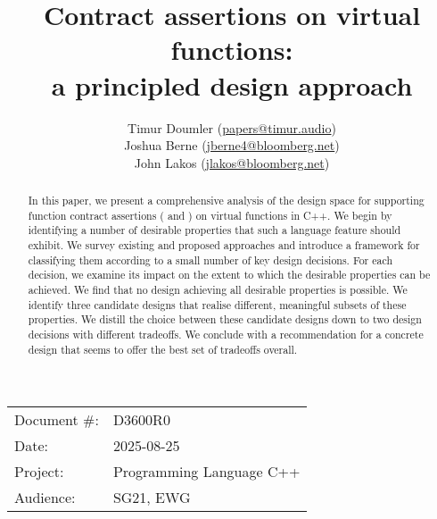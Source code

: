 \newcommand{\propref}[1]{\hyperref[#1]{\tcode{#1}}}



\title{Contract assertions on virtual functions: \\ a principled design approach}
\author{
Timur Doumler \small(\href{mailto:papers@timur.audio}{papers@timur.audio}) \\
Joshua Berne \small(\href{mailto:jberne4@bloomberg.net}{jberne4@bloomberg.net}) \\
John Lakos \small(\href{mailto:jlakos@bloomberg.net}{jlakos@bloomberg.net}) 
}
\date{}
\maketitle

\begin{tabular}{ll}
Document \#: & D3600R0 \\
Date: &2025-08-25 \\
Project: & Programming Language C++ \\
Audience: & SG21, EWG
\end{tabular}

\begin{abstract}
In this paper, we present a comprehensive analysis of the design space for supporting function contract assertions ( and ) on virtual functions in C++. We begin by identifying a number of desirable properties that such a language feature should exhibit. We survey existing and proposed approaches and introduce a framework for classifying them according to a small number of key design decisions. For each decision, we examine its impact on the extent to which the desirable properties can be achieved. We find that no design achieving all desirable properties is possible. We identify three candidate designs that realise different, meaningful subsets of these properties. We distill the choice between these candidate designs down to two design decisions with different tradeoffs. We conclude with a recommendation for a concrete design that seems to offer the best set of tradeoffs overall.
\end{abstract}


\pagebreak
\tableofcontents*
\pagebreak


